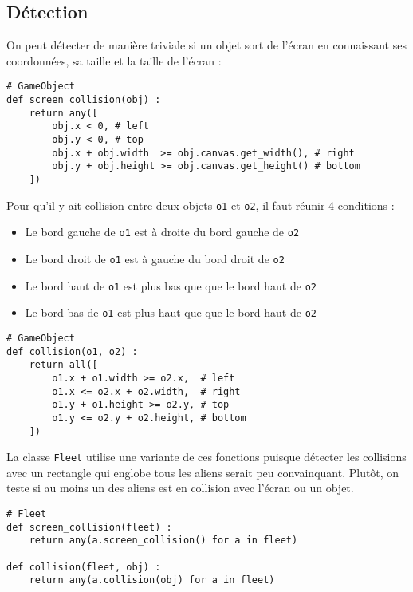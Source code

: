 \documentclass[12pt]{article}
\begin{document}
	\subsection{Détection}
	On peut détecter de manière triviale si un objet sort de l'écran en connaissant ses coordonnées, sa taille et la taille de l'écran :

\begin{verbatim}
# GameObject
def screen_collision(obj) :
	return any([
		obj.x < 0, # left
		obj.y < 0, # top
		obj.x + obj.width  >= obj.canvas.get_width(), # right
		obj.y + obj.height >= obj.canvas.get_height() # bottom
	])
\end{verbatim}


	Pour qu'il y ait collision entre deux objets \texttt{o1} et \texttt{o2}, il faut réunir 4 conditions :
	\begin{itemize}

	\item Le bord gauche de \texttt{o1} est à droite du bord gauche de \texttt{o2}
	\item Le bord droit de \texttt{o1} est à gauche du bord droit de \texttt{o2}
	\item Le bord haut de \texttt{o1} est plus bas que que le bord haut de \texttt{o2}
	\item Le bord bas de \texttt{o1} est plus haut que que le bord haut de \texttt{o2}

	\end{itemize}

\begin{verbatim}
# GameObject
def collision(o1, o2) :
	return all([
		o1.x + o1.width >= o2.x,  # left
		o1.x <= o2.x + o2.width,  # right
		o1.y + o1.height >= o2.y, # top
		o1.y <= o2.y + o2.height, # bottom
	])
\end{verbatim}


	La classe \texttt{Fleet} utilise une variante de ces fonctions puisque détecter les collisions avec un rectangle qui englobe tous les aliens serait peu convainquant.
	Plutôt, on teste si au moins un des aliens est en collision avec l'écran ou un objet.

\begin{verbatim}
# Fleet
def screen_collision(fleet) :
	return any(a.screen_collision() for a in fleet)

def collision(fleet, obj) :
	return any(a.collision(obj) for a in fleet)
\end{verbatim}
\end{document}
